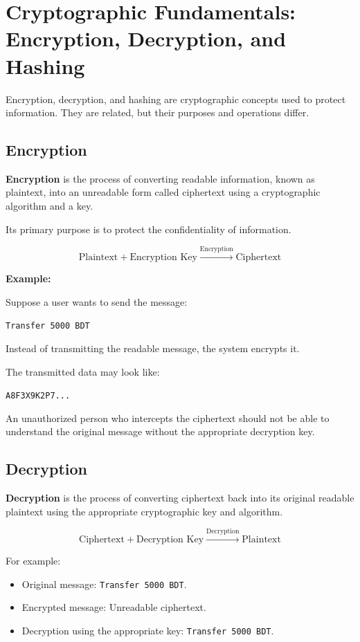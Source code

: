 \section{Cryptographic Fundamentals: Encryption, Decryption, and Hashing}


Encryption, decryption, and hashing are cryptographic concepts used to protect information. They are related, but their purposes and operations differ.

\subsection{Encryption}

\textbf{Encryption} is the process of converting readable information, known as plaintext, into an unreadable form called ciphertext using a cryptographic algorithm and a key.

Its primary purpose is to protect the confidentiality of information.



\[
\text{Plaintext}+\text{Encryption Key} \xrightarrow{\text{Encryption}} \text{Ciphertext}
\]



\textbf{Example:}

Suppose a user wants to send the message:

\texttt{Transfer 5000 BDT}

Instead of transmitting the readable message, the system encrypts it.

The transmitted data may look like:

\texttt{A8F3X9K2P7...}

An unauthorized person who intercepts the ciphertext should not be able to understand the original message without the appropriate decryption key.

\subsection{Decryption}

\textbf{Decryption} is the process of converting ciphertext back into its original readable plaintext using the appropriate cryptographic key and algorithm.



\[
\text{Ciphertext}+\text{Decryption Key} \xrightarrow{\text{Decryption}} \text{Plaintext}
\]



For example:

\begin{itemize}
\item Original message: \texttt{Transfer 5000 BDT}.
\item Encrypted message: Unreadable ciphertext.
\item Decryption using the appropriate key: \texttt{Transfer 5000 BDT}.
\end{itemize}

